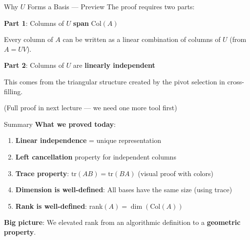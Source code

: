 \documentclass[10pt]{beamer}
\theoremstyle{definition}
\newcommand{\x}[1]{\alert{\textbf{#1}}}
\begin{document}
\begin{frame}{Why $U$ Forms a Basis — Preview}
The proof requires two parts:

\vfill
\textbf{Part 1}: Columns of $U$ \x{span} $\text{Col}(A)$

Every column of $A$ can be written as a linear combination of columns of $U$ (from $A = UV$).

\vfill
\textbf{Part 2}: Columns of $U$ are \x{linearly independent}

This comes from the triangular structure created by the pivot selection in cross-filling.

\vfill
(Full proof in next lecture — we need one more tool first)
\end{frame}

\begin{frame}{Summary}
\textbf{What we proved today}:

\begin{enumerate}
\item \x{Linear independence} = unique representation
\item \x{Left cancellation} property for independent columns
\item \x{Trace property}: $\text{tr}(AB) = \text{tr}(BA)$ (visual proof with colors)
\item \x{Dimension is well-defined}: All bases have the same size (using trace)
\item \x{Rank is well-defined}: rank$(A) = \dim(\text{Col}(A))$
\end{enumerate}

\vfill
\x{Big picture}: We elevated rank from an algorithmic definition to a \x{geometric property}.
\end{frame}
\end{document}
